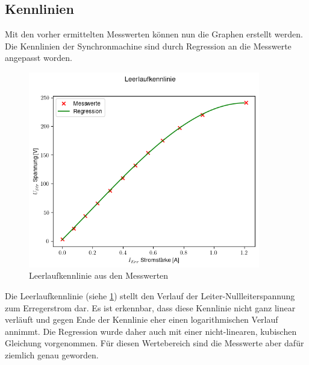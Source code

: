 \documentclass{report}
\begin{document}
\subsection{Kennlinien}
\label{sec:kennlinien}

Mit den vorher ermittelten Messwerten können nun die Graphen erstellt werden. Die Kennlinien der Synchronmachine sind durch Regression an die Messwerte angepasst worden.

\begin{figure}[!ht]
	\centering
	\includegraphics[width=0.9\textwidth]{./assets/img/leerlauf_kennlinie.png}
	\caption{Leerlaufkennlinie aus den Messwerten}
	\label{fig:leerlaufkennlinie}
\end{figure}

Die Leerlaufkennlinie (siehe \ref{fig:leerlaufkennlinie}) stellt den Verlauf der Leiter-Nullleiterspannung zum Erregerstrom dar. Es ist erkennbar, dass diese Kennlinie nicht ganz linear verläuft und gegen Ende der Kennlinie eher einen logarithmischen Verlauf annimmt. Die Regression wurde daher auch mit einer nicht-linearen, kubischen Gleichung vorgenommen. Für diesen Wertebereich sind die Messwerte aber dafür ziemlich genau geworden.
\end{document}

